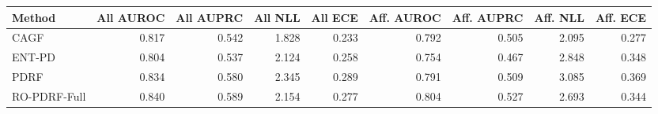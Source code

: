 \begin{tabular}{lrrrrrrrr}
\toprule
Method & All AUROC & All AUPRC & All NLL & All ECE & Aff. AUROC & Aff. AUPRC & Aff. NLL & Aff. ECE \\
\midrule
CAGF & 0.817 & 0.542 & 1.828 & 0.233 & 0.792 & 0.505 & 2.095 & 0.277 \\
ENT-PD & 0.804 & 0.537 & 2.124 & 0.258 & 0.754 & 0.467 & 2.848 & 0.348 \\
PDRF & 0.834 & 0.580 & 2.345 & 0.289 & 0.791 & 0.509 & 3.085 & 0.369 \\
RO-PDRF-Full & 0.840 & 0.589 & 2.154 & 0.277 & 0.804 & 0.527 & 2.693 & 0.344 \\
\bottomrule
\end{tabular}